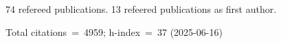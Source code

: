74 refereed publications. 13 refeered publications as first author.

Total citations~=~4959; h-index~=~37 (2025-06-16)